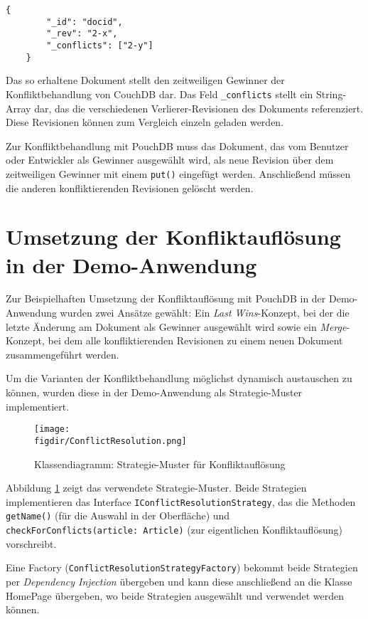 \begin{codebox}
	\begin{lstlisting}[style=typescript]
	{
		"_id": "docid",
		"_rev": "2-x",
		"_conflicts": ["2-y"]
	}
	\end{lstlisting}
\end{codebox}

Das so erhaltene Dokument stellt den zeitweiligen Gewinner der Konfliktbehandlung von CouchDB dar.
Das Feld \texttt{\_conflicts} stellt ein String-Array dar, das die verschiedenen Verlierer-Revisionen des Dokuments referenziert. Diese Revisionen können zum Vergleich einzeln geladen werden.

Zur Konfliktbehandlung mit PouchDB muss das Dokument, das vom Benutzer oder Entwickler als Gewinner ausgewählt wird, als neue Revision über dem zeitweiligen Gewinner mit einem \texttt{put()} eingefügt werden. Anschließend müssen die anderen konfliktierenden Revisionen gelöscht werden.

\section{Umsetzung der Konfliktauflösung in der Demo-Anwendung}

Zur Beispielhaften Umsetzung der Konfliktauflösung mit PouchDB in der Demo-Anwendung wurden zwei Ansätze gewählt: Ein \emph{Last Wins}-Konzept, bei der die letzte Änderung am Dokument als Gewinner ausgewählt wird sowie ein \emph{Merge}-Konzept, bei dem alle konfliktierenden Revisionen zu einem neuen Dokument zusammengeführt werden.

Um die Varianten der Konfliktbehandlung möglichst dynamisch austauschen zu können, wurden diese in der Demo-Anwendung als Strategie-Muster implementiert.

\begin{figure}[htb]
	\centering
	\caption{Klassendiagramm: Strategie-Muster für Konfliktauflösung}
	\label{fig:conflictresolutionstrategy}
	\texttt{[image: \\figdir/ConflictResolution.png]}
\end{figure}

Abbildung \ref{fig:conflictresolutionstrategy} zeigt das verwendete Strategie-Muster. Beide Strategien implementieren das Interface \texttt{IConflictResolutionStrategy}, das die Methoden \texttt{getName()} (für die Auswahl in der Oberfläche) und \texttt{checkForConflicts(article: Article)} (zur eigentlichen Konfliktauflösung) vorschreibt.

Eine Factory (\texttt{ConflictResolutionStrategyFactory}) bekommt beide Strategien per \emph{Dependency Injection} übergeben und kann diese anschließend an die Klasse HomePage übergeben, wo beide Strategien ausgewählt und verwendet werden können.
